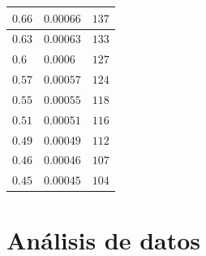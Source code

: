 \documentclass[letterpaper, 12pt]{article}
\begin{document}
\begin{table}[H]
\begin{tabularx}{\linewidth}{|>{\centering\arraybackslash}X|>{\centering\arraybackslash}X|>{\centering\arraybackslash}X|}
            $0.66$          & $0.00066$      & $137$  \\\hline
            $0.63$          & $0.00063$      & $133$  \\\hline
            $0.6 $          & $0.0006 $      & $127$  \\\hline
            $0.57$          & $0.00057$      & $124$  \\\hline
            $0.55$          & $0.00055$      & $118$  \\\hline
            $0.51$          & $0.00051$      & $116$  \\\hline
            $0.49$          & $0.00049$      & $112$  \\\hline
            $0.46$          & $0.00046$      & $107$  \\\hline
            $0.45$          & $0.00045$      & $104$  \\\hline
      \end{tabularx}
\end{table}

\section{Análisis de datos}

\subsection{}
\end{document}
